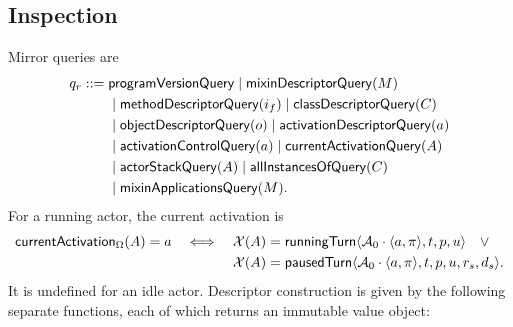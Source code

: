 \subsection{Inspection}

Mirror queries are
\begin{equation}\label{eq:mirror-query-grammar}
\begin{split}
 q_r::={}&\mathsf{programVersionQuery}\mid\mathsf{mixinDescriptorQuery}(M)\\
 &\mid\mathsf{methodDescriptorQuery}(i_f)\mid\mathsf{classDescriptorQuery}(C)\\
 &\mid\mathsf{objectDescriptorQuery}(o)\mid\mathsf{activationDescriptorQuery}(a)\\
 &\mid\mathsf{activationControlQuery}(a)\mid\mathsf{currentActivationQuery}(A)\\
 &\mid\mathsf{actorStackQuery}(A)\mid\mathsf{allInstancesOfQuery}(C)\\
 &\mid\mathsf{mixinApplicationsQuery}(M).
\end{split}
\end{equation}
For a running actor, the current activation is
\begin{equation}\label{eq:current-activation}
 \mathsf{currentActivation}_{\Omega}(A)=a
 \quad\Longleftrightarrow\quad
 \begin{aligned}[t]
 \mathcal X(A)&=\mathsf{runningTurn}\langle
   \mathcal A_0\mathbin{\cdot}\langle a,\pi\rangle,t,p,u\rangle
 \quad\lor\\
 \mathcal X(A)&=\mathsf{pausedTurn}\langle
   \mathcal A_0\mathbin{\cdot}\langle a,\pi\rangle,t,p,u,r_s,d_s\rangle.
 \end{aligned}
\end{equation}
It is undefined for an idle actor.  Descriptor construction is given by the
following separate functions, each of which returns an immutable value object:
